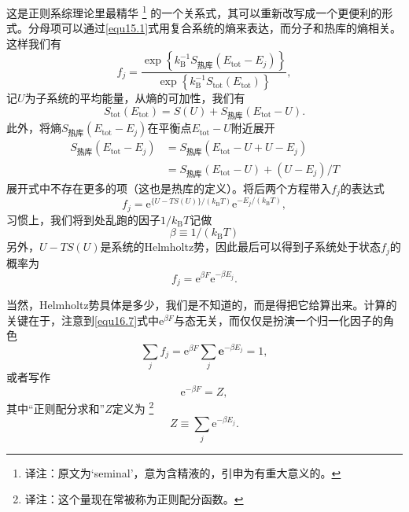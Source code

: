 这是正则系综理论里最精华%
\footnote{译注：原文为`seminal'，意为含精液的，引申为有重大意义的。}%
的一个关系式，其可以重新改写成一个更便利的形式。分母项可以通过\eqref{equ15.1}式用复合系统的熵来表达，而分子和热库的熵相关。这样我们有
\begin{equation}
f_j = \frac{\exp\left\{k_\text{B}^{-1}S_\text{热库}(E_\text{tot}-E_j)\right\}}{\exp\left\{k_\text{B}^{-1}S_\text{tot}(E_\text{tot})\right\}} ,
\end{equation}
记$U$为子系统的平均能量，从熵的可加性，我们有
\begin{equation}
S_\text{tot}(E_\text{tot}) = S(U) + S_\text{热库}(E_\text{tot}-U).
\end{equation}
此外，将熵$S_\text{热库}(E_\text{tot}-E_j)$在平衡点$E_\text{tot}-U$附近展开
\begin{equation}
\begin{aligned}
S_\text{热库}(E_\text{tot}-E_j)& = S_\text{热库}(E_\text{tot}-U+U-E_j)\\
&= S_\text{热库}(E_\text{tot}-U) + (U-E_j)/T
\end{aligned}
\end{equation}
展开式中不存在更多的项（这也是热库的定义）。将后两个方程带入$f_j$的表达式
\begin{equation}
f_j = {\mathrm e}^{\{U-TS(U)\}/(k_\text{B}T)} {\mathrm e}^{-E_j/(k_\text{B}T)},
\end{equation}
习惯上，我们将到处乱跑的因子$1/k_\text{B}T$记做
\begin{equation}
\beta \equiv 1/(k_\text{B}T)
\end{equation}
另外，$U-TS(U)$是系统的Helmholtz势，因此最后可以得到子系统处于状态$f_j$的概率为
\begin{equation}
f_j = {\mathrm e}^{\beta F}{\mathrm e}^{-\beta E_j}.
\label{equ16.7}
\end{equation}

当然，Helmholtz势具体是多少，我们是不知道的，而是得把它给算出来。计算的关键在于，注意到\eqref{equ16.7}式中${\mathrm e}^{\beta F}$与态无关，而仅仅是扮演一个归一化因子的角色
\begin{equation}
\sum\limits_j f_j = {\mathrm e}^{\beta F}\sum\limits_j {\mathbf e}^{-\beta E_j} = 1,
\end{equation}
或者写作
\begin{equation}
{\mathrm e}^{-\beta F}=Z,
\label{equ16.9}
\end{equation}
其中“正则配分求和”$Z$定义为%
\footnote{译注：这个量现在常被称为正则配分函数。}
\begin{equation}
Z\equiv \sum\limits_j {\mathrm e}^{-\beta E_j}.
\label{equ16.10}
\end{equation}


